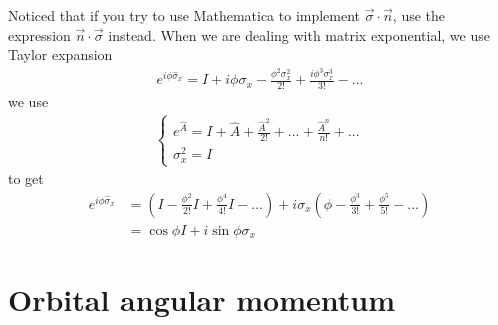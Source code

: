 \documentclass[UTF8,12pt]{article} %
\numberwithin{equation}{section}
\begin{document}
Noticed that if you try to use Mathematica to implement $\vec{\sigma}\cdot\vec{n}$, use the expression $\vec{n}\cdot\vec{\sigma}$ instead. When we are dealing with matrix exponential, we use Taylor expansion
\begin{align}
e^{i\phi\hat{\sigma}_{x}} = I + i\phi \sigma_{x} - \frac{\phi^{2}\sigma_{x}^{2}}{2!} + \frac{i\phi^{3}\sigma_{x}^{3}}{3!} - ...
\end{align}
we use
\begin{align}
\begin{cases}
e^{\hat{A}} = I + \hat{A} + \frac{\hat{A}^{2}}{2!} + ... + \frac{\hat{A}^{n}}{n!} + ...\\
\sigma_{x}^{2} = I
\end{cases}
\end{align}
to get
\begin{align}
e^{i\phi\hat{\sigma}_{x}} &= \left(I - \frac{\phi^{2}}{2!}I + \frac{\phi^{4}}{4!}I - ...\right) + i\sigma_{x} \left(\phi - \frac{\phi^{3}}{3!} + \frac{\phi^{5}}{5!} - ...\right) \\
&= \cos\phi I + i\sin\phi\sigma_{x}
\end{align}

\section{Orbital angular momentum}
\end{document}
